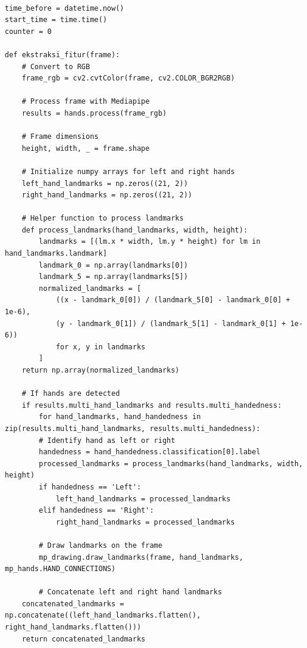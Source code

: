 \begin{lstlisting}
	
time_before = datetime.now()
start_time = time.time()
counter = 0
	
def ekstraksi_fitur(frame):
	# Convert to RGB
	frame_rgb = cv2.cvtColor(frame, cv2.COLOR_BGR2RGB)
	
	# Process frame with Mediapipe
	results = hands.process(frame_rgb)
	
	# Frame dimensions
	height, width, _ = frame.shape
	
	# Initialize numpy arrays for left and right hands
	left_hand_landmarks = np.zeros((21, 2))
	right_hand_landmarks = np.zeros((21, 2))
	
	# Helper function to process landmarks
	def process_landmarks(hand_landmarks, width, height):
		landmarks = [(lm.x * width, lm.y * height) for lm in hand_landmarks.landmark]
		landmark_0 = np.array(landmarks[0])
		landmark_5 = np.array(landmarks[5])
		normalized_landmarks = [
			((x - landmark_0[0]) / (landmark_5[0] - landmark_0[0] + 1e-6),
			(y - landmark_0[1]) / (landmark_5[1] - landmark_0[1] + 1e-6))
			for x, y in landmarks
		]
	return np.array(normalized_landmarks)
	
	# If hands are detected
	if results.multi_hand_landmarks and results.multi_handedness:
		for hand_landmarks, hand_handedness in zip(results.multi_hand_landmarks, results.multi_handedness):
		# Identify hand as left or right
		handedness = hand_handedness.classification[0].label
		processed_landmarks = process_landmarks(hand_landmarks, width, height)
		if handedness == 'Left':
			left_hand_landmarks = processed_landmarks
		elif handedness == 'Right':
			right_hand_landmarks = processed_landmarks
		
		# Draw landmarks on the frame
		mp_drawing.draw_landmarks(frame, hand_landmarks, mp_hands.HAND_CONNECTIONS)
		
		# Concatenate left and right hand landmarks
	concatenated_landmarks = np.concatenate((left_hand_landmarks.flatten(), right_hand_landmarks.flatten()))
	return concatenated_landmarks
\end{lstlisting}

